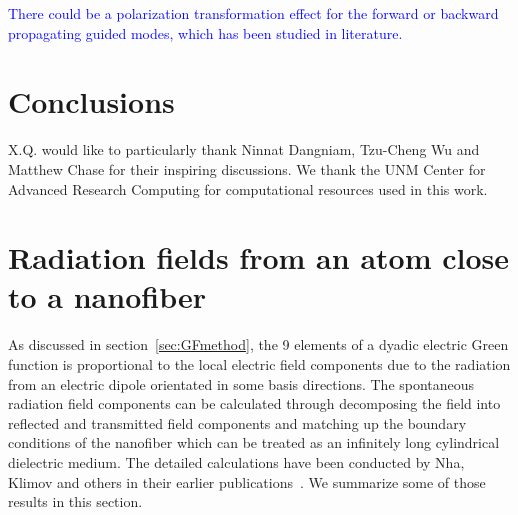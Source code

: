 \documentclass[preprint,aps,pra,onecolumn]{revtex4-1} %
\begin{document}
\textcolor{blue}{There could be a polarization transformation effect for the forward or backward propagating guided modes, which has been studied in literature.} 

\section{Conclusions}

\begin{acknowledgments}
X.Q. would like to particularly thank Ninnat Dangniam, Tzu-Cheng Wu and Matthew Chase for their inspiring discussions. We thank the UNM Center for Advanced Research Computing for computational resources used in this work.
\end{acknowledgments}

\appendix
\section{Radiation fields from an atom close to a nanofiber}\label{app:fieldcalculation}
As discussed in section~\ref{sec:GFmethod}, the 9 elements of a dyadic electric Green function is proportional to the local electric field components due to the radiation from an electric dipole orientated in some basis directions. The spontaneous radiation field components can be calculated through decomposing the field into reflected and transmitted field components and matching up the boundary conditions of the nanofiber which can be treated as an infinitely long cylindrical dielectric medium. The detailed calculations have been conducted by Nha, Klimov and others in their earlier publications~\cite{Nha1997,Klimov2004}. We summarize some of those results in this section. 
\end{document}
